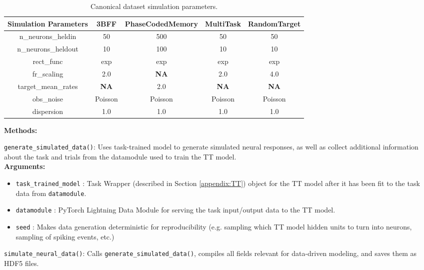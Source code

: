 \documentclass{article}
\begin{document}
\begin{table}[ht]
\centering
\begin{tabular}{|c|c|c|c|c|}
\hline
\textbf{Simulation Parameters} & \textbf{3BFF} & \textbf{PhaseCodedMemory} & \textbf{MultiTask} & \textbf{RandomTarget} \\ \hline
n\_neurons\_heldin & 50 & 500 & 50 & 50 \\ \hline
n\_neurons\_heldout & 10 & 100 & 10 & 10 \\ \hline
rect\_func & exp & exp & exp & exp \\ \hline
fr\_scaling & 2.0 & \textbf{NA} & 2.0 & 4.0 \\ \hline
target\_mean\_rates & \textbf{NA} & 2.0 & \textbf{NA} & \textbf{NA} \\ \hline
obs\_noise & Poisson & Poisson & Poisson & Poisson \\ \hline
dispersion & 1.0 & 1.0 & 1.0 & 1.0 \\ \hline

\end{tabular}
\caption{Canonical dataset simulation parameters.}
\label{table:DataSimParams}
\end{table}

\textbf{Methods:}

\texttt{generate\_simulated\_data()}: Uses task-trained model to generate simulated neural responses, as well as collect additional information about the task and trials from the datamodule used to train the TT model.\\
\vspace{-0.2cm}
\textbf{Arguments:}
\begin{itemize}
    \item  \texttt{task\_trained\_model} : Task Wrapper (described in Section \ref{appendix:TT}) object for the TT model after it has been fit to the task data from \texttt{datamodule}.
    \item \texttt{datamodule} : PyTorch Lightning Data Module for serving the task input/output data to the TT model.
    \item \texttt{seed} : Makes data generation deterministic for reproducibility (e.g. sampling which TT model hidden units to turn into neurons, sampling of spiking events, etc.)
\end{itemize}

\texttt{simulate\_neural\_data()}:  Calls \texttt{generate\_simulated\_data()}, compiles all fields relevant for data-driven modeling, and saves them as HDF5 files.
\end{document}
